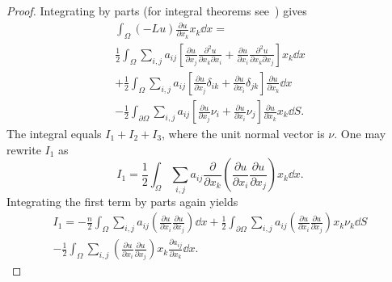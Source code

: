\begin{proof}
  Integrating by parts (for integral theorems see~\citep[p. 20]
  {zeidler1988nonlinear}) gives
  \begin{multline*}
    \int_{\Omega} (-Lu) \frac{\partial u}{\partial x_k} x_k \dd{x}
    = \\
    \frac{1}{2} \int_{\Omega} \sum_{i,j} a_{ij} \left[ \frac{\partial
    u}{\partial x_j} \frac{\partial^2 u}{\partial x_k\partial x_i} +
    \frac{\partial u}{\partial x_i} \frac{\partial^2 u}{\partial x_k\partial
    x_j} \right] x_k \dd{x} \\
    + \frac{1}{2} \int_{\Omega} \sum_{i,j} a_{ij} \left[ \frac{\partial
    u}{\partial x_j} \delta_{ik} + \frac{\partial u}{\partial x_i} \delta_{jk}
    \right] \frac{\partial u}{\partial x_k} \dd{x} \\
    - \frac{1}{2} \int_{\partial\Omega} \sum_{i,j} a_{ij} \left[ \frac{\partial
    u}{\partial x_j} \nu_{i} + \frac{\partial u}{\partial x_i} \nu_{j} \right]
    \frac{\partial u}{\partial x_k} x_k \dd{S}.
  \end{multline*}
  The integral equals $I_1 + I_2 + I_3$, where the unit normal vector is $\nu$.
  One may rewrite $I_1$ as
  \[
    I_1 = \frac{1}{2} \int_{\Omega} \sum_{i,j} a_{ij} \frac{\partial}{\partial
    x_k}\left( \frac{\partial u}{\partial x_i} \frac{\partial u}{\partial x_j}
    \right) x_k \dd{x}.
  \]
  Integrating the first term by parts again yields
  \begin{multline*}
    I_1 = -\frac{n}{2} \int_{\Omega} \sum_{i,j} a_{ij} \left( \frac{\partial
    u}{\partial x_i} \frac{\partial u}{\partial x_j} \right) \dd{x} +
    \frac{1}{2} \int_{\partial\Omega} \sum_{i,j} a_{ij} \left( \frac{\partial
    u}{\partial x_i} \frac{\partial u}{\partial x_j} \right) x_k \nu_k \dd{S}
    \\
    - \frac{1}{2} \int_{\Omega} \sum_{i,j} \left( \frac{\partial u}{\partial
    x_i} \frac{\partial u}{\partial x_j} \right) x_k \frac{\partial
    a_{ij}}{\partial x_k}\dd{x}.
  \end{multline*}



\end{proof}
